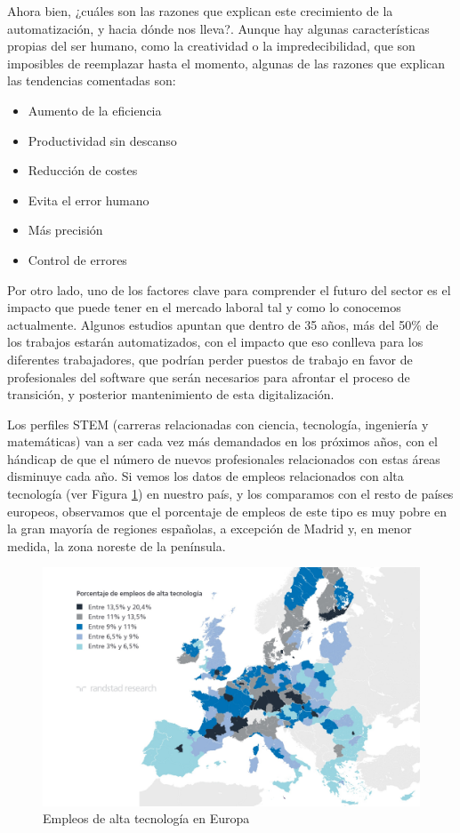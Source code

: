 \documentclass[12pt,spanish,chapterprefix, numbers=noenddot]{book}
\numberwithin{equation}{section}
\numberwithin{figure}{section}
\begin{document}
Ahora bien, ¿cuáles son las razones que explican este crecimiento de la automatización, y hacia dónde nos lleva?. Aunque hay algunas características propias del ser humano, como la creatividad o la impredecibilidad, que son imposibles de reemplazar hasta el momento, algunas de las razones que explican las tendencias comentadas son:
\begin{itemize}
\item Aumento de la eficiencia 
\item Productividad sin descanso
\item Reducción de costes
\item Evita el error humano
\item Más precisión
\item Control de errores
\end{itemize}
Por otro lado, uno de los factores clave para comprender el futuro del sector es el impacto que puede tener en el mercado laboral tal y como lo conocemos actualmente. Algunos estudios \cite{automation_forecast} \cite{mckinsey_automation} apuntan que dentro de 35 años, más del 50\% de los trabajos estarán automatizados, con el impacto que eso conlleva para los diferentes trabajadores, que podrían perder puestos de trabajo en favor de profesionales del software que serán necesarios para afrontar el proceso de transición, y posterior mantenimiento de esta digitalización. 

Los perfiles STEM (carreras relacionadas con ciencia, tecnología, ingeniería y matemáticas) van a ser cada vez más demandados en los próximos años, con el hándicap de que el número de nuevos profesionales relacionados con estas áreas disminuye cada año. 
Si vemos los datos de empleos relacionados con alta tecnología (ver Figura \ref{fig:empleoEur}) en nuestro país, y los comparamos con el resto de países europeos, observamos que el porcentaje de empleos de este tipo es muy pobre en la gran mayoría de regiones españolas, a excepción de Madrid y, en menor medida, la zona noreste de la península. 

\begin{figure}[hbt!]
\centering
\includegraphics[width=12cm]{Figs/empleosTecEur.jpg}
\par
\caption{\label{fig:empleoEur}Empleos de alta tecnología en Europa}
\end{figure}
\end{document}
